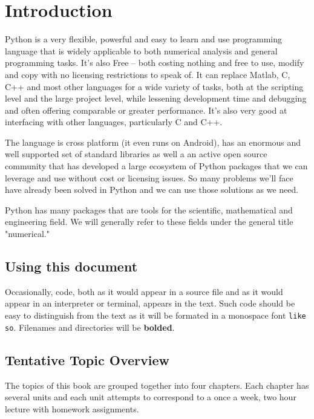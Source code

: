 
\chapter{Introduction}
Python is a very flexible, powerful and easy to learn and use programming language that is widely applicable to both numerical analysis and general programming tasks. It's also Free -- both costing nothing and free to use, modify and copy with no licensing restrictions to speak of. It can replace Matlab, C, C++ and most other languages for a wide variety of tasks, both at the scripting level and the large project level,  while lessening development time and debugging and often offering comparable or greater performance. It's also very good at interfacing with other languages, particularly C and C++. 

The language is cross platform (it even runs on Android), has an enormous and well supported set of standard libraries as well a an active open source community that has developed a large ecosystem of Python packages that we can leverage and use without cost or licensing issues. So many problems we'll face have already been solved in Python and we can use those solutions as we need.

Python has many packages that are tools for the scientific, mathematical and engineering field. We will generally refer to these fields under the general title "numerical."

\section{Using this document}

Occasionally, code, both as it would appear in a source file and as it would appear in an interpreter or terminal, appears in the text. Such code should be easy to distinguish from the text as it will be formated in a monospace font \verb|like so|. Filenames and directories will be \textbf{bolded}.

\section{Tentative Topic Overview}

The topics of this book are grouped together into four chapters. Each chapter has several units and each unit attempts to correspond to a once a week, two hour lecture with homework assignments. 


